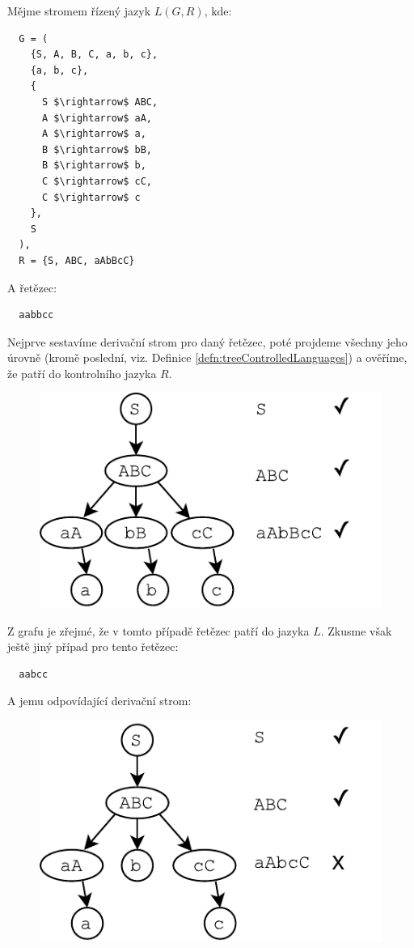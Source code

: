 \begin{exmp}
  \label{exmp:abc}
  Mějme stromem řízený jazyk $L(G, R)$, kde:
  \begin{lstlisting}
  G = (
    {S, A, B, C, a, b, c},
    {a, b, c},
    {
      S $\rightarrow$ ABC,
      A $\rightarrow$ aA,
      A $\rightarrow$ a,
      B $\rightarrow$ bB,
      B $\rightarrow$ b,
      C $\rightarrow$ cC,
      C $\rightarrow$ c
    },
    S
  ),
  R = {S, ABC, aAbBcC}
  \end{lstlisting}
  \noindent
  A řetězec:

  \begin{lstlisting}
  aabbcc
  \end{lstlisting}

  \noindent
  Nejprve sestavíme derivační strom pro daný řetězec, poté projdeme všechny
  jeho úrovně (kromě poslední, viz. Definice \ref{defn:treeControlledLanguages}) a
  ověříme, že patří do kontrolního jazyka $R$.

  \begin{figure}[H]
    \centering
    \includegraphics{fig/TreeControlledGrammar1.pdf}
  \end{figure}

  \noindent
  Z grafu je zřejmé, že v tomto případě řetězec patří do jazyka $L$.
  Zkusme však ještě jiný případ pro tento řetězec:

  \begin{lstlisting}
  aabcc
  \end{lstlisting}

  \noindent
  A jemu odpovídající derivační strom:
  \begin{figure}[H]
    \centering
    \includegraphics{fig/TreeControlledGrammar2.pdf}
  \end{figure}


\end{exmp}
